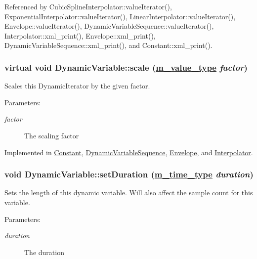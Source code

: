 Referenced by Cubic\-Spline\-Interpolator::value\-Iterator(), Exponential\-Interpolator::value\-Iterator(), Linear\-Interpolator::value\-Iterator(), Envelope::value\-Iterator(), Dynamic\-Variable\-Sequence::value\-Iterator(), Interpolator::xml\_\-print(), Envelope::xml\_\-print(), Dynamic\-Variable\-Sequence::xml\_\-print(), and Constant::xml\_\-print().\hypertarget{classDynamicVariable_a4}{
\subsubsection[scale]{\setlength{\rightskip}{0pt plus 5cm}virtual void Dynamic\-Variable::scale (\hyperlink{Types_8h_a3}{m\_\-value\_\-type} {\em factor})}}
\label{classDynamicVariable_a4}


Scales this Dynamic\-Iterator by the given factor. \begin{Desc}
\item[Parameters:]
\begin{description}
\item[{\em factor}]The scaling factor \end{description}
\end{Desc}


Implemented in \hyperlink{classConstant_a5}{Constant}, \hyperlink{classDynamicVariableSequence_a25}{Dynamic\-Variable\-Sequence}, \hyperlink{classEnvelope_a27}{Envelope}, and \hyperlink{classInterpolator_a4}{Interpolator}.\hypertarget{classDynamicVariable_a6}{
\subsubsection[setDuration]{\setlength{\rightskip}{0pt plus 5cm}void Dynamic\-Variable::set\-Duration (\hyperlink{Types_8h_a2}{m\_\-time\_\-type} {\em duration})}}
\label{classDynamicVariable_a6}


Sets the length of this dynamic variable. Will also affect the sample count for this variable. \begin{Desc}
\item[Parameters:]
\begin{description}
\item[{\em duration}]The duration \end{description}
\end{Desc}


